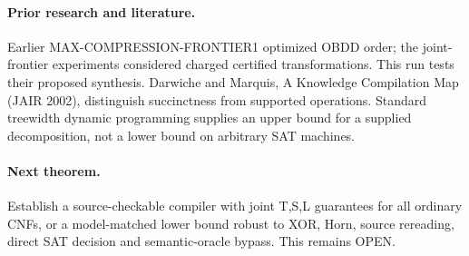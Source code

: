 \documentclass{article}
\begin{document}
\paragraph{Prior research and literature.} Earlier MAX-COMPRESSION-FRONTIER1 optimized OBDD order; the joint-frontier experiments considered charged certified transformations. This run tests their proposed synthesis. Darwiche and Marquis, A Knowledge Compilation Map (JAIR 2002), distinguish succinctness from supported operations. Standard treewidth dynamic programming supplies an upper bound for a supplied decomposition, not a lower bound on arbitrary SAT machines.
\paragraph{Next theorem.} Establish a source-checkable compiler with joint T,S,L guarantees for all ordinary CNFs, or a model-matched lower bound robust to XOR, Horn, source rereading, direct SAT decision and semantic-oracle bypass. This remains OPEN.
\end{document}
